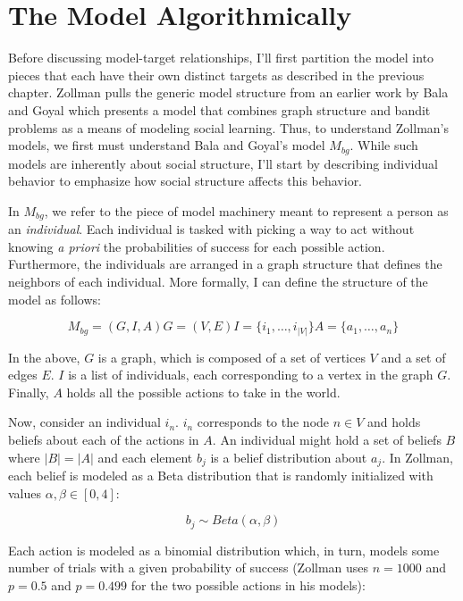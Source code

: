\hypertarget{the-model-algorithmically}{%
\section{The Model Algorithmically}\label{the-model-algorithmically}}

Before discussing model-target relationships, I'll first partition the
model into pieces that each have their own distinct targets as described
in the previous chapter. Zollman pulls the generic model structure from
an earlier work by Bala and Goyal \autocite{balaLearningNeighbours1998}
which presents a model that combines graph structure and bandit problems
as a means of modeling social learning. Thus, to understand Zollman's
models, we first must understand Bala and Goyal's model \(M_{bg}\).
While such models are inherently about social structure, I'll start by
describing individual behavior to emphasize how social structure affects
this behavior.

In \(M_{bg}\), we refer to the piece of model machinery meant to
represent a person as an \emph{individual}. Each individual is tasked
with picking a way to act without knowing \emph{a priori} the
probabilities of success for each possible action. Furthermore, the
individuals are arranged in a graph structure that defines the neighbors
of each individual. More formally, I can define the structure of the
model as follows:

\[ M_{bg} = (G, I, A) G = (V, E) I = \{ i_1, \ldots, i_{|V|} \} A = \{ a_1, \ldots, a_n \}\]

In the above, \(G\) is a graph, which is composed of a set of vertices
\(V\) and a set of edges \(E\). \(I\) is a list of individuals, each
corresponding to a vertex in the graph \(G\). Finally, \(A\) holds all
the possible actions to take in the world.

Now, consider an individual \(i_n\). \(i_n\) corresponds to the node
\(n \in V\) and holds beliefs about each of the actions in \(A\). An
individual might hold a set of beliefs \(B\) where \(|B| = |A|\) and
each element \(b_j\) is a belief distribution about \(a_j\). In Zollman,
each belief is modeled as a Beta distribution that is randomly
initialized with values \(\alpha, \beta \in \left[0, 4\right]\):

\[b_j \sim Beta(\alpha, \beta)\]

Each action is modeled as a binomial distribution which, in turn, models
some number of trials with a given probability of success (Zollman uses
\(n = 1000\) and \(p = 0.5\) and \(p = 0.499\) for the two possible
actions in his models):

